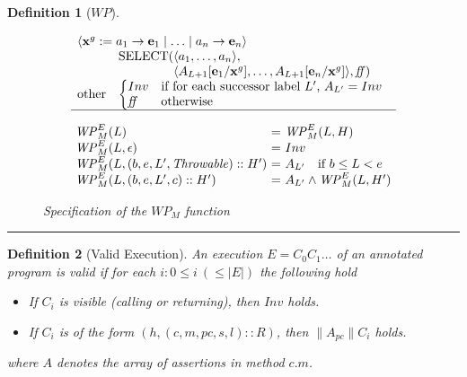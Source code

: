 \documentclass[a4paper,11pt]{article}
\newtheorem{definition}{Definition}
\newcommand{\Inv}{\mathit{Inv}}
\newcommand{\pc}{\mathit{pc}}
\newcommand{\WP}{\mathit{WP}}
\newcommand{\sep}{\hspace{-1.5707965cm}\rule{\paperwidth}{1pt}}
\newcommand{\SELECT}{\mbox{SELECT}}
\newcommand{\FALSE}{\mathit{ff}}
\newcommand{\ghost}[1]{{\it #1}^g}
\begin{document}
\begin{definition}[$\WP$]
\begin{figure}
\[\begin{array}{ll}
\multicolumn{2}{l}{\langle \ghost{\bf x} := a_1 \rightarrow {\bf e}_1 \mid \ldots \mid a_n \rightarrow {\bf e}_n \rangle} \\
 & \begin{array}{@{}l@{}l@{}}\SELECT(&\langle a_1, \ldots, a_n\rangle,\\ & \langle A_{L+1}
[{\bf e}_1/\ghost{{\bf x}}], \ldots, A_{L+1}[{\bf e}_n/\ghost{{\bf x}}]\rangle,\FALSE)\end{array} \\ 

\textrm{other}             & \left\{\begin{array}{@{}ll}
                                    Inv   & \textrm{if for each successor label $L'$, $A_{L'} = Inv$} \\
                                    \FALSE & \mbox{otherwise}
                                    \end{array}\right. \\ \hline
\end{array}
\]





\[
\begin{array}{l@{~=~}l}
\WP_M^E(L) & \WP_M^E(L, H) \\
\WP_M^E(L, \epsilon) & Inv \\
\WP_M^E(L, (b, e, L', \mathit{Throwable}) :: H') & A_{L'} \quad \mbox{if $b \leq L < e$} \\
\WP_M^E(L, (b, e, L', c) :: H') & A_{L'} \land \WP_M^E(L, H')
\end{array}
\]

\caption{\label{fig:wp} Specification of the $\WP_M$ function}
\end{figure}
\end{definition}


\sep


\begin{definition}[Valid Execution]
An execution $E = C_0C_1\ldots$ of an annotated program is \emph{valid} if for each $i: 0 \leq i~(\leq |E|)$ the following hold
\begin{itemize}
\item If $C_i$ is visible (calling or returning), then $\Inv$ holds.
\item If $C_i$ is of the form $(h, (c, m, \pc, s, l)::R)$, then $\| A_{\pc} \| C_i$ holds.
\end{itemize}
where $A$ denotes the array of assertions in method $c.m$.
\end{definition}
\end{document}
